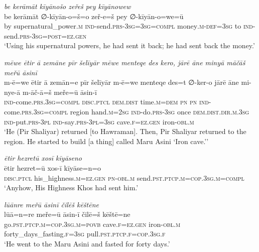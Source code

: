 \ea \label{ŽP.110}
\textit{be kerāmāt kīyānošo zeřeš pey kīyānowew} \\ 
\gll be kerāmāt ∅-kīyān-o=š=o zeř-e=š pey ∅-kīyān-o=we=ū \\ 
 by supernatural\_power\textsc{.m} \textsc{ind-}send\textsc{.prs}\textsc{-3sg}\textsc{=3sg}\textsc{=compl} money\textsc{.m}\textsc{-def}\textsc{=3sg} to \textsc{ind-}send\textsc{.prs}\textsc{-3sg}\textsc{=\textsc{post}}\textsc{\textsc{=ez.gen}} \\ 
\glt `Using his supernatural powers, he had sent it back; he had sent back the money.'
\z 
 
\ea \label{ŽP.116}
\textit{mēwe ētir ā zemāne pīr šelīyār mēwe menteqe des kero, jārē āne minyā māčāš meřū āsinī} \\ 
\gll m-ē=we ētir ā zemān=e pīr šelīyār m-ē=we menteqe des=t ∅-ker-o jārē āne mi-nye-ā m-āč-ā=š meře=ū āsin-ī \\ 
 \textsc{ind-}come\textsc{.prs}\textsc{.3sg}\textsc{=compl} \textsc{disc.ptcl} \textsc{dem.dist} time\textsc{.m}\textsc{=dem} \textsc{pn} \textsc{pn} \textsc{ind-}come\textsc{.prs}\textsc{.3sg}\textsc{=compl} region hand\textsc{.m}\textsc{=\textsc{2sg}} \textsc{ind-}do\textsc{.prs}\textsc{-3sg} once \textsc{dem.dist}\textsc{.dir}\textsc{.m}\textsc{.3sg} \textsc{ind-}put\textsc{.prs}\textsc{-3pl} \textsc{ind-}say\textsc{.prs}\textsc{-3pl}\textsc{=3sg} cave\textsc{.f}\textsc{\textsc{=ez.gen}} iron\textsc{-obl}\textsc{.m} \\ 
\glt `He (Pir Shaliyar) returned [to Hawraman]. Then, Pir Shaliyar returned to the region. He started to build [a thing] called Maru Asini ‘Iron cave.’'
\z 
 
\ea \label{ŽP.117}
\textit{ētir hezretū xosī kīyāseno} \\ 
\gll ētir hezret=ū xos-ī kīyāse=n=o \\ 
 \textsc{disc.ptcl} his\_highness\textsc{.m}\textsc{\textsc{=ez.gen}} \textsc{pn}\textsc{-obl}\textsc{.m} send\textsc{.pst}\textsc{.ptcp}\textsc{.m}\textsc{=cop}\textsc{.3sg}\textsc{.m}\textsc{=compl} \\ 
\glt `Anyhow, His Highness Khos had sent him.'
\z 
 
\ea \label{ŽP.118}
\textit{lūānre meřū āsinī čilēš kēštēne} \\ 
\gll lūā=n=re meře=ū āsin-ī čilē=š kēštē=ne \\ 
 go\textsc{.pst}\textsc{.ptcp}\textsc{.m}\textsc{=cop}\textsc{.3sg}\textsc{.m}\textsc{=\textsc{povb}} cave\textsc{.f}\textsc{\textsc{=ez.gen}} iron\textsc{-obl}\textsc{.m} forty\_days\_fasting\textsc{.f}\textsc{=3sg} pull\textsc{.pst}\textsc{.ptcp}\textsc{.f}\textsc{=cop}\textsc{.3sg}\textsc{.f} \\ 
\glt `He went to the Maru Asini and fasted for forty days.'
\z 
 
